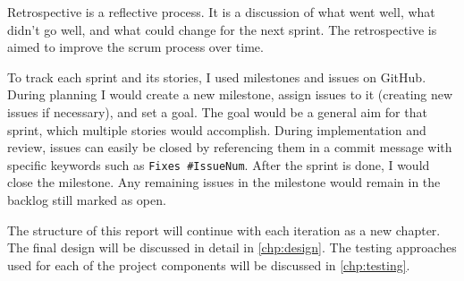 Retrospective is a reflective process. It is a discussion of what went well, what didn't go well, and what could change for the next sprint. The retrospective is aimed to improve the scrum process over time.

To track each sprint and its stories, I used milestones and issues on GitHub\cite{GitHubMilestones}. During planning I would create a new milestone, assign issues to it (creating new issues if necessary), and set a goal. The goal would be a general aim for that sprint, which multiple stories would accomplish. During implementation and review, issues can easily be closed by referencing them in a commit message with specific keywords such as \texttt{Fixes \#IssueNum}\cite{GitHubCloseIssueCommit}. After the sprint is done, I would close the milestone. Any remaining issues in the milestone would remain in the backlog still marked as open.

The structure of this report will continue with each iteration as a new chapter. The final design will be discussed in detail in \autoref{chp:design}. The testing approaches used for each of the project components will be discussed in \autoref{chp:testing}. 
